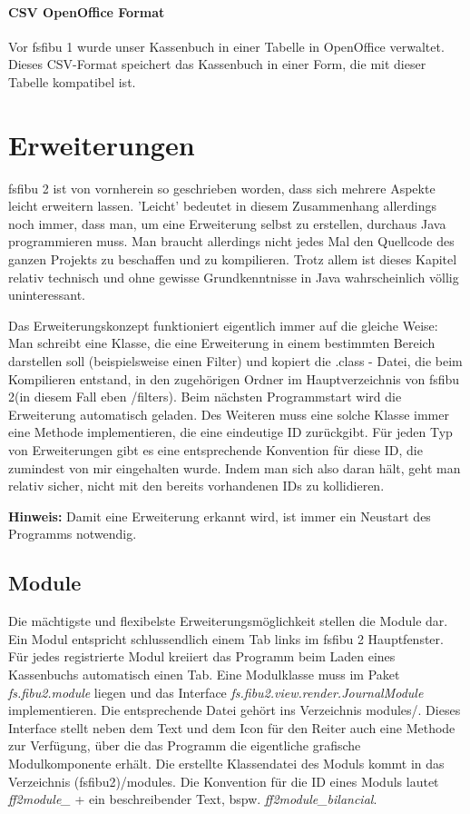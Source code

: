 \documentclass[a4paper,10pt,halfparskip,oneside,smallheadings]{scrbook}
\begin{document}
\subsubsection{CSV OpenOffice Format}
Vor fsfibu 1 wurde unser Kassenbuch in einer Tabelle in OpenOffice verwaltet. Dieses CSV-Format speichert das Kassenbuch in einer Form, die mit dieser Tabelle kompatibel ist.


\chapter{Erweiterungen}

fsfibu 2 ist von vornherein so geschrieben worden, dass sich mehrere Aspekte leicht erweitern lassen. 'Leicht' bedeutet in diesem Zusammenhang allerdings noch immer, dass man, um eine Erweiterung selbst zu erstellen, durchaus Java programmieren muss. Man braucht allerdings nicht jedes Mal den Quellcode des ganzen Projekts zu beschaffen und zu kompilieren. Trotz allem ist dieses Kapitel relativ technisch und ohne gewisse Grundkenntnisse in Java wahrscheinlich völlig uninteressant.

Das Erweiterungskonzept funktioniert eigentlich immer auf die gleiche Weise: Man schreibt eine Klasse, die eine Erweiterung in einem bestimmten Bereich darstellen soll (beispielsweise einen Filter) und kopiert die .class - Datei, die beim Kompilieren entstand, in den zugehörigen Ordner im Hauptverzeichnis von fsfibu 2(in diesem Fall eben /filters). Beim nächsten Programmstart wird die Erweiterung automatisch geladen. Des Weiteren muss eine solche Klasse immer eine Methode implementieren, die eine eindeutige ID zurückgibt. Für jeden Typ von Erweiterungen gibt es eine entsprechende Konvention für diese ID, die zumindest von mir eingehalten wurde. Indem man sich also daran hält, geht man relativ sicher, nicht mit den bereits vorhandenen IDs zu kollidieren.

\textbf{Hinweis:} Damit eine Erweiterung erkannt wird, ist immer ein Neustart des Programms notwendig.

\section{Module}
Die mächtigste und flexibelste Erweiterungsmöglichkeit stellen die Module dar. Ein Modul entspricht schlussendlich einem Tab links im fsfibu 2 Hauptfenster. Für jedes registrierte Modul kreiiert das Programm beim Laden eines Kassenbuchs automatisch einen Tab. Eine Modulklasse muss im Paket \textit{fs.fibu2.module} liegen und das Interface \textit{fs.fibu2.view.render.JournalModule} implementieren. Die entsprechende Datei gehört ins Verzeichnis modules/. Dieses Interface stellt neben dem Text und dem Icon für den Reiter auch eine Methode zur Verfügung, über die das Programm die eigentliche grafische Modulkomponente erhält. Die erstellte Klassendatei des Moduls kommt in das Verzeichnis (fsfibu2)/modules. Die Konvention für die ID eines Moduls lautet \textit{ff2module\_} + ein beschreibender Text, bspw. \textit{ff2module\_bilancial}.
\end{document}
